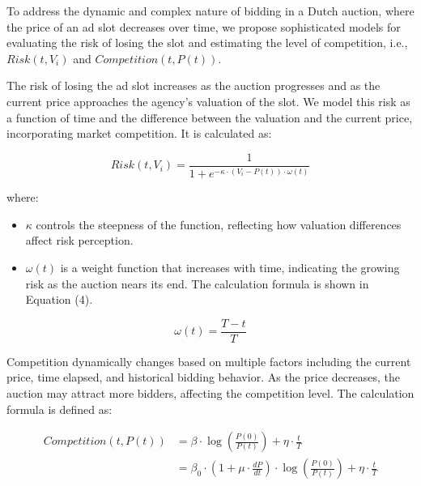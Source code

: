 To address the dynamic and complex nature of bidding in a Dutch auction, where the price of an ad slot decreases over time, we propose sophisticated models for evaluating the risk of losing the slot and estimating the level of competition, i.e., $Risk(t, V_i)$ and $Competition(t, P(t))$.



The risk of losing the ad slot increases as the auction progresses and as the current price approaches the agency's valuation of the slot. We model this risk as a function of time and the difference between the valuation and the current price, incorporating market competition. It is calculated as:

\begin{equation}
Risk(t, V_i) = \frac{1}{1 + e^{-\kappa \cdot (V_i - P(t)) \cdot \omega(t)}}
\end{equation}

where:
\begin{itemize}
    \item \( \kappa \) controls the steepness of the function, reflecting how valuation differences affect risk perception.
    \item \( \omega(t) \) is a weight function that increases with time, indicating the growing risk as the auction nears its end. The calculation formula is shown in Equation (4). 
\end{itemize}

\begin{equation}
\omega(t) = \frac{T - t}{T}
\end{equation}


Competition dynamically changes based on multiple factors including the current price, time elapsed, and historical bidding behavior. As the price decreases, the auction may attract more bidders, affecting the competition level. The calculation formula is defined as:

\begin{equation}
\begin{aligned}
Competition(t, P(t)) &= \beta \cdot \log\left(\frac{P(0)}{P(t)}\right) + \eta \cdot \frac{t}{T} \\
&= \beta_0 \cdot \left(1 + \mu \cdot \frac{dP}{dt}\right) \cdot \log\left(\frac{P(0)}{P(t)}\right) + \eta \cdot \frac{t}{T} \\
\end{aligned}
\end{equation}

